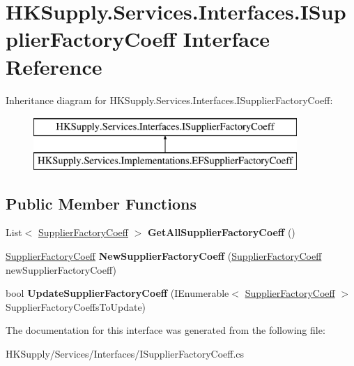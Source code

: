 \hypertarget{interface_h_k_supply_1_1_services_1_1_interfaces_1_1_i_supplier_factory_coeff}{}\section{H\+K\+Supply.\+Services.\+Interfaces.\+I\+Supplier\+Factory\+Coeff Interface Reference}
\label{interface_h_k_supply_1_1_services_1_1_interfaces_1_1_i_supplier_factory_coeff}
Inheritance diagram for H\+K\+Supply.\+Services.\+Interfaces.\+I\+Supplier\+Factory\+Coeff\+:\begin{figure}[H]
\begin{center}
\leavevmode
\includegraphics[height=2.000000cm]{interface_h_k_supply_1_1_services_1_1_interfaces_1_1_i_supplier_factory_coeff}
\end{center}
\end{figure}
\subsection*{Public Member Functions}
\begin{DoxyCompactItemize}
\item 
\mbox{\label{interface_h_k_supply_1_1_services_1_1_interfaces_1_1_i_supplier_factory_coeff_a5eca0f2a6594747b766893457c014eda}} 
List$<$ \mbox{\hyperlink{class_h_k_supply_1_1_models_1_1_supplier_factory_coeff}{Supplier\+Factory\+Coeff}} $>$ {\bfseries Get\+All\+Supplier\+Factory\+Coeff} ()
\item 
\mbox{\label{interface_h_k_supply_1_1_services_1_1_interfaces_1_1_i_supplier_factory_coeff_af3be896c152f9c31c528cd0ec06f576e}} 
\mbox{\hyperlink{class_h_k_supply_1_1_models_1_1_supplier_factory_coeff}{Supplier\+Factory\+Coeff}} {\bfseries New\+Supplier\+Factory\+Coeff} (\mbox{\hyperlink{class_h_k_supply_1_1_models_1_1_supplier_factory_coeff}{Supplier\+Factory\+Coeff}} new\+Supplier\+Factory\+Coeff)
\item 
\mbox{\label{interface_h_k_supply_1_1_services_1_1_interfaces_1_1_i_supplier_factory_coeff_aac15ec046b7f8e79e3a90e2c88a8c2e8}} 
bool {\bfseries Update\+Supplier\+Factory\+Coeff} (I\+Enumerable$<$ \mbox{\hyperlink{class_h_k_supply_1_1_models_1_1_supplier_factory_coeff}{Supplier\+Factory\+Coeff}} $>$ Supplier\+Factory\+Coeffs\+To\+Update)
\end{DoxyCompactItemize}


The documentation for this interface was generated from the following file\+:\begin{DoxyCompactItemize}
\item 
H\+K\+Supply/\+Services/\+Interfaces/I\+Supplier\+Factory\+Coeff.\+cs\end{DoxyCompactItemize}
